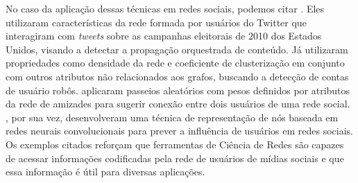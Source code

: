 No caso da aplicação dessas técnicas em redes sociais, podemos citar
\citet{ratkiewicz11}.
Eles utilizaram características da rede formada por usuários do Twitter que
interagiram com \textit{tweets} sobre as campanhas eleitorais de 2010 dos
Estados Unidos, visando a detectar a propagação orquestrada de conteúdo.
Já \citet{varol18} utilizaram propriedades como densidade da rede e coeficiente de
clusterização em conjunto com outros atributos não relacionados aos grafos,
buscando a detecção de contas de usuário robôs.
\citet{backstrom11} aplicaram passeios aleatórios com pesos definidos por
atributos da rede de amizades para sugerir conexão entre dois usuários de uma
rede social.
\citet{qiu18}, por sua vez, desenvolveram uma técnica de representação de nós
baseada em redes neurais convolucionais para prever a influência de usuários em
redes sociais.
Os exemplos citados reforçam que ferramentas de Ciência de Redes são capazes de
acessar informações codificadas pela rede de usuários de mídias sociais e que essa
informação é útil para diversas aplicações.



